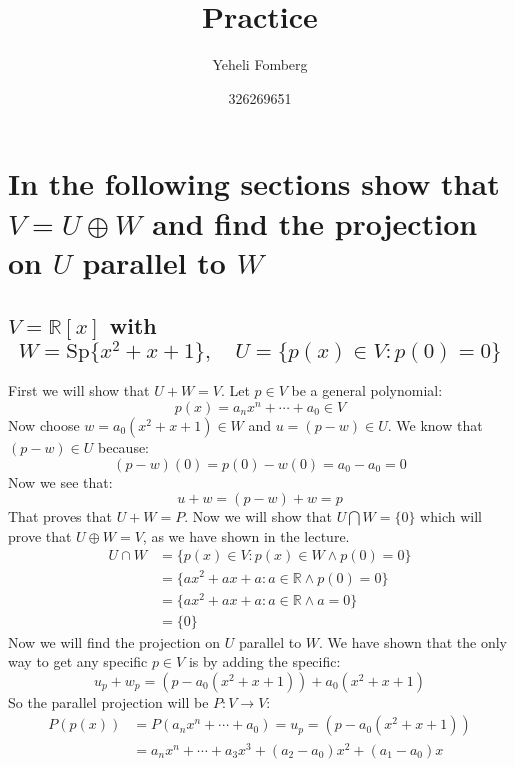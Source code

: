 \documentclass[11pt,a4paper]{article}
\title{\textbf{Practice}}
\author{Yeheli Fomberg}
\date{326269651}
\theoremstyle{plain}
\newcommand{\R}{\mathbb{R}}
\begin{document}
	\maketitle
	\newpage
	
	\section{In the following sections show that $V = U \oplus W$ and find
	the projection on $U$ parallel to $W$}
	\subsection{$V = \R[x]$ with 
	\[ W = \text{Sp}\{x^2+x+1\},\quad U = \{p(x)\in V \colon p(0) = 0\} \]
	}
	
	First we will show that $U + W = V$. Let $p\in V$ be a general polynomial:
	\[ p(x) = a_nx^n + \cdots + a_0 \in V\]
	Now choose $w = a_0(x^2+x+1) \in W$ and $u = (p-w) \in U$. We know that
	$(p-w)\in U$ because: 
	\[ (p-w)(0) = p(0) - w(0) = a_0 - a_0 = 0 \]
	Now we see that: 
	\[ u + w = (p-w) + w = p \] 
	That proves that $U + W = P$. Now we will show that $U\bigcap W = \{0\}$
	which will prove that $U\oplus W = V$, as we have shown in the lecture.
	\begin{align*}
		U\cap W &= \{p(x)\in V \colon p(x)\in W \land p(0) = 0\} \\
		&= \{ax^2+ax+a \colon a\in\R \land p(0) = 0\} \\
		&= \{ax^2+ax+a \colon a\in\R \land a = 0\} \\
		&= \{0\}
	\end{align*}
	Now we will find the projection on $U$ parallel to $W$. We have shown that
	the only way to get any specific $p\in V$ is by adding the specific:
	\[
		u_p + w_p = (p-a_0(x^2+x+1)) + a_0(x^2+x+1)
	\]
	So the parallel projection will be $P \colon V\to V$:
	\begin{align*}
		P(p(x)) &= P(a_nx^n + \cdots + a_0) = u_p = (p-a_0(x^2+x+1)) \\
		&= a_nx^n + \cdots + a_3x^3 + (a_2-a_0)x^2 + (a_1-a_0)x
	\end{align*}
	
	\newpage
	
\end{document}
